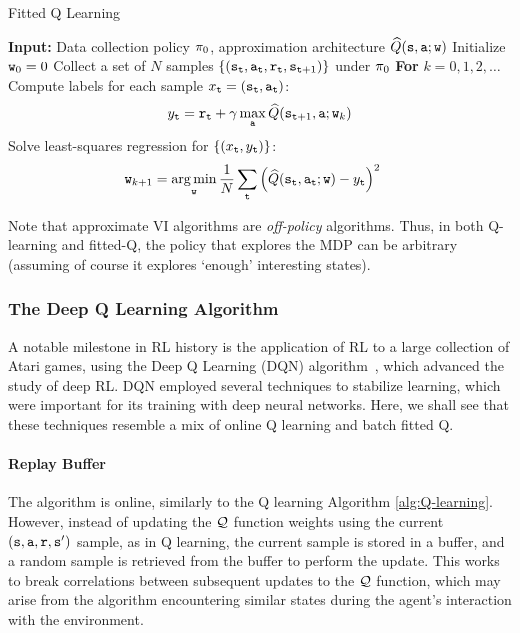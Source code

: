 \begin{algorithm}[H]
\caption{Fitted Q Learning}\label{alg:fitted_Q}
\begin{algorithmic}[1]
\State \textbf{Input:} Data collection policy $\pi_0$, approximation architecture $\widehat{Q}({\tt s}, {\tt a};{\tt w})$
\State Initialize ${\tt w}_{0}=0$
\State Collect a set of $N$ samples $\{({\tt s}_{\tt t}, {\tt a}_{\tt t}, {\tt r}_{\tt t}, {\tt s}_{{\tt t}+1})\}$ under $\pi_0$
\State \textbf{For} {$k = 0,1,2,\dots$ }
    \State \quad Compute labels for each sample $x_{\tt t} = ({\tt s}_{\tt t}, {\tt a}_{\tt t})$: 
\begin{align*}
y_{\tt t} = {\tt r}_{\tt t} + \gamma \max_{\tt a} \widehat{Q}({\tt s}_{{\tt t}+1}, {\tt a};{\tt w}_{k})
\end{align*}
\State \quad Solve least-squares regression for $\{ (x_{\tt t},y_{\tt t})\}$: 
\begin{align*}
\weights_{k+1} &= \argmin_\weights \frac{1}{N}\sum_{\ttime} \left( \widehat{Q}(\state_{\ttime}, \action_\ttime;\weights) - y_\ttime\right)^2
\end{align*}
\end{algorithmic}
\end{algorithm}


Note that approximate VI algorithms are \emph{off-policy} algorithms. Thus, in both Q-learning and fitted-Q, the policy that explores the MDP can be arbitrary (assuming of course it explores `enough' interesting states).

\subsubsection{The Deep Q Learning Algorithm}

A notable milestone in RL history is the application of RL to a large collection of Atari games, using the Deep Q Learning (DQN) algorithm~\citep{mnih2015human}, which advanced the study of deep RL. DQN employed several  techniques to stabilize learning, which were important for its training with deep neural networks. Here, we shall see that these techniques resemble a mix of online Q learning and batch fitted Q.

\paragraph{Replay Buffer} The algorithm is online, similarly to the Q learning Algorithm \ref{alg:Q-learning}. However, instead of updating the $\mathcal{Q}$ function weights using the current $({\tt s},{\tt a},{\tt r},{\tt s}')$ sample, as in Q learning, the current sample is stored in a buffer, and a random sample is retrieved from the buffer to perform the update. This works to break correlations between subsequent updates to the $\mathcal{Q}$ function, which may arise from the algorithm encountering similar states during the agent's interaction with the environment.

